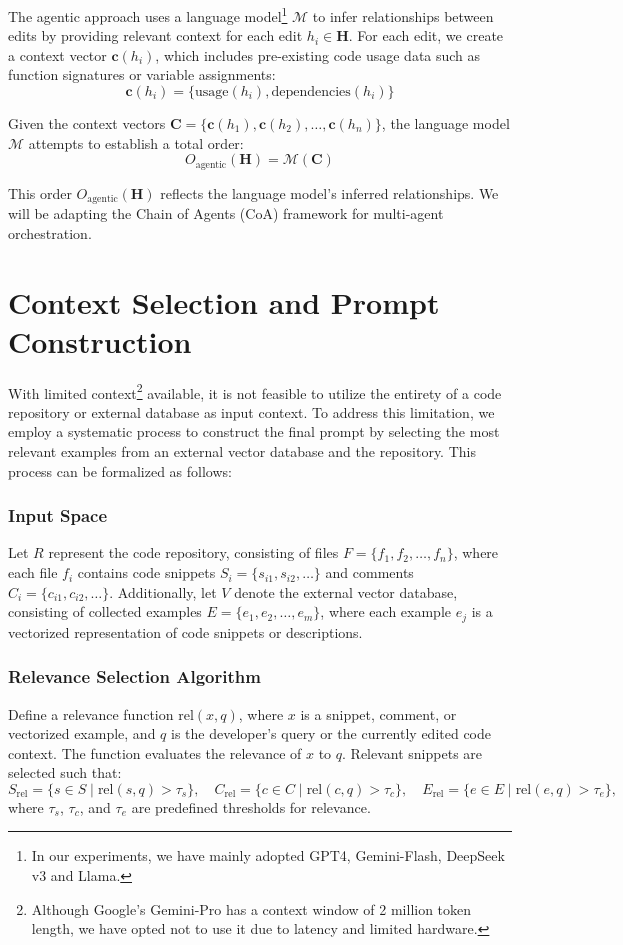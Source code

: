 The agentic approach uses a language model\footnote{In our experiments, we have mainly adopted GPT4, Gemini-Flash, DeepSeek v3 and Llama.} \( \mathcal{M} \) to infer relationships between edits by providing relevant context for each edit \( h_i \in \mathbf{H} \). For each edit, we create a context vector \( \mathbf{c}(h_i) \), which includes pre-existing code usage data such as function signatures or variable assignments:
\[
\mathbf{c}(h_i) = \{ \text{usage}(h_i), \text{dependencies}(h_i) \}
\]

Given the context vectors \( \mathbf{C} = \{\mathbf{c}(h_1), \mathbf{c}(h_2), \dots, \mathbf{c}(h_n)\} \), the language model \( \mathcal{M} \) attempts to establish a total order:
\[
O_{\text{agentic}}(\mathbf{H}) = \mathcal{M}(\mathbf{C})
\]

This order \( O_{\text{agentic}}(\mathbf{H}) \) reflects the language model's inferred relationships. We will be adapting the Chain of Agents (CoA) framework for multi-agent orchestration.

\section{Context Selection and Prompt Construction}

With limited context\footnote{Although Google's Gemini-Pro has a context window of 2 million token length, we have opted not to use it due to latency and limited hardware.} available, it is not feasible to utilize the entirety of a code repository or external database as input context. To address this limitation, we employ a systematic process to construct the final prompt by selecting the most relevant examples from an external vector database and the repository. This process can be formalized as follows:

\subsubsection{Input Space}
Let \( R \) represent the code repository, consisting of files \( F = \{f_1, f_2, \ldots, f_n\} \), where each file \( f_i \) contains code snippets \( S_i = \{s_{i1}, s_{i2}, \ldots\} \) and comments \( C_i = \{c_{i1}, c_{i2}, \ldots\} \). Additionally, let \( V \) denote the external vector database, consisting of collected examples \( E = \{e_1, e_2, \ldots, e_m\} \), where each example \( e_j \) is a vectorized representation of code snippets or descriptions.

\subsubsection{Relevance Selection Algorithm}
Define a relevance function \( \text{rel}(x, q) \), where \( x \) is a snippet, comment, or vectorized example, and \( q \) is the developer's query or the currently edited code context. The function evaluates the relevance of \( x \) to \( q \). Relevant snippets are selected such that:
\[
S_{\text{rel}} = \{s \in S \mid \text{rel}(s, q) > \tau_s\}, \quad C_{\text{rel}} = \{c \in C \mid \text{rel}(c, q) > \tau_c\}, \quad E_{\text{rel}} = \{e \in E \mid \text{rel}(e, q) > \tau_e\},
\]
where \( \tau_s \), \( \tau_c \), and \( \tau_e \) are predefined thresholds for relevance.

